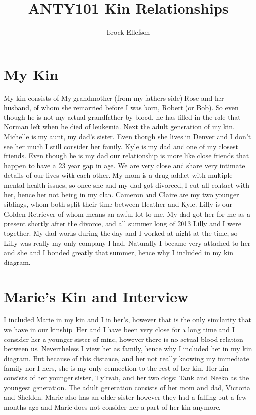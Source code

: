 \documentclass[12pt,a4paper]{article}
\author{Brock Ellefson}
\title{ANTY101 Kin Relationships}
\begin{document}
\doublespacing
\maketitle
\section*{My Kin}
My kin consists of My grandmother (from my fathers side) Rose and her husband, of whom she remarried before I was born, Robert (or Bob). So even though he is not my actual grandfather by blood, he has filled in the role that Norman left when he died of leukemia. Next the adult generation of my kin. Michelle is my aunt, my dad's sister. Even though she lives in Denver and I don't see her much I still consider her family. Kyle is my dad and one of my closest friends. Even though he is my dad our relationship is more like close friends that happen to have a 23 year gap in age. We are very close and share very intimate details of our lives with each other. My mom is a drug addict with multiple mental health issues, so once she and my dad got divorced, I cut all contact with her, hence her not being in my clan. Cameron and Claire are my two younger siblings, whom both split their time between Heather and Kyle. Lilly is our Golden Retriever of whom means an awful lot to me. My dad got her for me as a present shortly after the divorce, and all summer long of 2013 Lilly and I were together. My dad works during the day and I worked at night at the time, so Lilly was really my only company I had. Naturally I became very attached to her and she and I bonded greatly that summer, hence why I included in my kin diagram. 
\section*{Marie's Kin and Interview}
I included Marie in my kin and I in her's, however that is the only similarity that we have in our kinship. Her and I have been very close for a long time and I consider her a younger sister of mine, however there is no actual blood relation between us. Nevertheless I view her as family, hence why I included her in my kin diagram. But because of this distance, and her not really knowing my immediate family nor I hers, she is my only connection to the rest of her kin. Her kin consists of her younger sister, Ty'reah, and her two dogs: Tank and Neeko as the youngest generation. The adult generation consists of her mom and dad, Victoria and Sheldon. Marie also has an older sister however they had a falling out a few months ago and Marie does not consider her a part of her kin anymore. 
\end{document}
